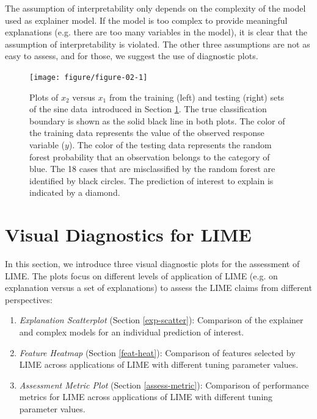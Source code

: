\documentclass[AMS,STIX2COL]{WileyNJD-v2}\usepackage[]{graphicx}\usepackage[]{color}
\newenvironment{knitrout}{}{} %
\newcommand{\data}{sine data}
\begin{document}
The assumption of interpretability only depends on the complexity of the model used as explainer model. If the model is too complex to provide meaningful explanations (e.g. there are too many variables in the model), it is clear that the assumption of interpretability is violated. The other three assumptions are not as easy to assess, and for those, we suggest the use of diagnostic plots. 



\begin{figure}[!thp]
\centering
\begin{knitrout}
\color{fgcolor}

{\centering \texttt{[image: figure/figure-02-1]} 

}



\end{knitrout}
\caption{Plots of $x_2$ versus $x_1$ from the training (left) and testing (right) sets of the \data \ introduced in Section \ref{diagnostics}. The true classification boundary is shown as the solid black line in both plots. The color of the training data  represents the value of the observed response variable ($y$). The color of the testing data  represents the random forest probability that an observation belongs to the category of blue. The 18 cases that are misclassified by the random forest are identified by black circles. The prediction of interest to explain is indicated by a diamond.}
\label{fig:figure-02}
\end{figure}

\section{Visual Diagnostics for LIME} \label{diagnostics}





In this section, we introduce three visual diagnostic plots for the assessment of LIME. The plots focus on different levels of application of LIME (e.g. on explanation versus a set of explanations) to assess the LIME claims from different perspectives:

\begin{enumerate}
\item \emph{Explanation Scatterplot} (Section \ref{exp-scatter}): Comparison of the explainer and complex models for an individual prediction of interest.
\item \emph{Feature Heatmap} (Section \ref{feat-heat}): Comparison of features selected by LIME across applications of LIME with different tuning parameter values.
\item \emph{Assessment Metric Plot} (Section \ref{assess-metric}): Comparison of performance metrics for LIME across applications of LIME with different tuning parameter values. 
\end{enumerate}
\end{document}
